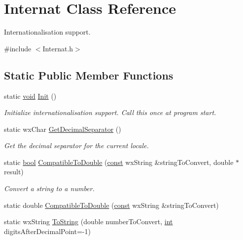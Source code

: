 \hypertarget{class_internat}{}\section{Internat Class Reference}
\label{class_internat}


Internationalisation support.  




{\ttfamily \#include $<$Internat.\+h$>$}

\subsection*{Static Public Member Functions}
\begin{DoxyCompactItemize}
\item 
static \hyperlink{sound_8c_ae35f5844602719cf66324f4de2a658b3}{void} \hyperlink{class_internat_a5de09291f82ccdc28520ee813c05ac6b}{Init} ()
\begin{DoxyCompactList}\small\item\em Initialize internationalisation support. Call this once at program start. \end{DoxyCompactList}\item 
static wx\+Char \hyperlink{class_internat_a057aee5bd669ededbe147f958ee064af}{Get\+Decimal\+Separator} ()
\begin{DoxyCompactList}\small\item\em Get the decimal separator for the current locale. \end{DoxyCompactList}\item 
static \hyperlink{mac_2config_2i386_2lib-src_2libsoxr_2soxr-config_8h_abb452686968e48b67397da5f97445f5b}{bool} \hyperlink{class_internat_ab79e779c79e9ddf82270cb78e78d638d}{Compatible\+To\+Double} (\hyperlink{getopt1_8c_a2c212835823e3c54a8ab6d95c652660e}{const} wx\+String \&string\+To\+Convert, double $\ast$result)
\begin{DoxyCompactList}\small\item\em Convert a string to a number. \end{DoxyCompactList}\item 
static double \hyperlink{class_internat_a32d8cacc9600a1b418c1589b2f388671}{Compatible\+To\+Double} (\hyperlink{getopt1_8c_a2c212835823e3c54a8ab6d95c652660e}{const} wx\+String \&string\+To\+Convert)
\item 
static wx\+String \hyperlink{class_internat_a333f7a2e572730a3b4d46d41f4cd0bb1}{To\+String} (double number\+To\+Convert, \hyperlink{xmltok_8h_a5a0d4a5641ce434f1d23533f2b2e6653}{int} digits\+After\+Decimal\+Point=-\/1)

\end{DoxyCompactItemize}
